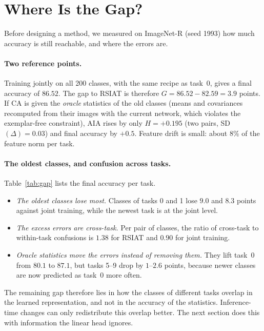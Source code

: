 \section{Where Is the Gap?}
\label{sec:gap}

Before designing a method, we measured on ImageNet-R (seed 1993) how much
accuracy is still reachable, and where the errors are.

\paragraph{Two reference points.}
Training jointly on all 200 classes, with the same recipe as task~0, gives
a final accuracy of $86.52$. The gap to RSIAT is therefore
$G=86.52-82.59=3.9$ points. If CA is given the \emph{oracle} statistics of
the old classes (means and covariances recomputed from their images with
the current network, which violates the exemplar-free constraint), AIA
rises by only $H=+0.195$ (two pairs, SD$(\Delta)=0.03$) and final accuracy
by $+0.5$. Feature drift is small: about $8\%$ of the feature norm per task.

\paragraph{The oldest classes, and confusion across tasks.}
Table~\ref{tab:gap} lists the final accuracy per task.

\begin{itemize}
  \item \emph{The oldest classes lose most.} Classes of tasks 0 and 1 lose
    $9.0$ and $8.3$ points against joint training, while the newest task is
    at the joint level.
  \item \emph{The excess errors are cross-task.} Per pair of classes, the
    ratio of cross-task to within-task confusions is $1.38$ for RSIAT and
    $0.90$ for joint training.
  \item \emph{Oracle statistics move the errors instead of removing them.}
    They lift task~0 from $80.1$ to $87.1$, but tasks 5--9 drop by $1$--$2.6$
    points, because newer classes are now predicted as task~0 more often.
\end{itemize}

The remaining gap therefore lies in how the classes of different tasks
overlap in the learned representation, and not in the accuracy of the
statistics. Inference-time changes can only redistribute this overlap
better. The next section does this with information the linear head
ignores.

